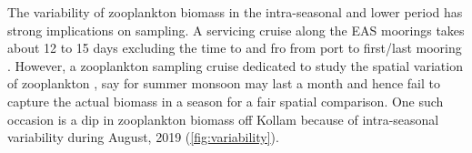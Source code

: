 \documentclass{article}
\begin{document}
	The variability of zooplankton biomass in the intra-seasonal and lower period has strong implications on sampling. A servicing cruise along the EAS moorings takes about 12 to 15 days excluding the time to and fro from port to first/last mooring \citep{chaudhuri2020observed, aparna2022seasonal}. However, a zooplankton sampling cruise dedicated to study the spatial variation of zooplankton \citep{madhupratap1992zooplankton,smith1998seasonal,wishner1998mesozooplankton, kidwai2000dd, marra2005jgofs}, say for summer monsoon may last a month and hence fail to capture the actual biomass in a season for a fair spatial comparison. One such occasion is a dip in zooplankton biomass off Kollam because of intra-seasonal variability during August, 2019 (\cref{fig:variability}).   
	
	
	 
	
	
	
	
	
	
	
	
%	
%	

   

\linespread{1.5}	
{\footnotesize 	 %
}	
\newpage
{} 
\end{document}
